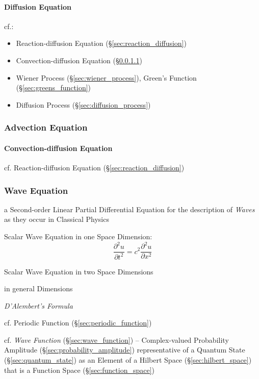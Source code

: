 {\paragraph{Diffusion Equation}\label{sec:diffusion_equation}\hfill

\fist cf.:
\begin{itemize}
  \item Reaction-diffusion Equation (\S\ref{sec:reaction_diffusion})
  \item Convection-diffusion Equation (\S\ref{sec:convection_diffusion})
  \item Wiener Process (\S\ref{sec:wiener_process}), Green's Function
    (\S\ref{sec:greens_function})
  \item Diffusion Process (\S\ref{sec:diffusion_process})
\end{itemize}



\subsubsection{Advection Equation}\label{sec:advection_equation}

\paragraph{Convection-diffusion Equation}
\label{sec:convection_diffusion}\hfill

cf. Reaction-diffusion Equation (\S\ref{sec:reaction_diffusion})



\subsubsection{Wave Equation}\label{sec:wave_equation}

a Second-order Linear Partial Differential Equation for the description of
\emph{Waves} as they occur in Classical Physics

Scalar Wave Equation in one Space Dimension:
\[
  \frac{\partial^2 u}{\partial{t}^2} = c^2 \frac{\partial^2 u}{\partial{x}^2}
\]

Scalar Wave Equation in two Space Dimensions

in general Dimensions

\emph{D'Alembert's Formula}

cf. Periodic Function (\S\ref{sec:periodic_function})

cf. \emph{Wave Function} (\S\ref{sec:wave_function}) -- Complex-valued
Probability Amplitude (\S\ref{sec:probability_amplitude}) representative of a
Quantum State (\S\ref{sec:quantum_state}) as an Element of a Hilbert Space
(\S\ref{sec:hilbert_space}) that is a Function Space
(\S\ref{sec:function_space})



}
